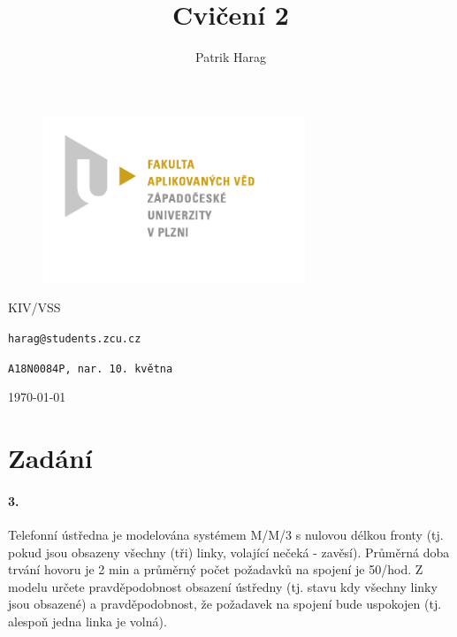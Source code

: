 \documentclass[12pt, a4paper]{article}
\title{Cvičení 2}
\author{Patrik Harag}
\makeatletter
\def \thesubtitle {KIV/VSS}
\def \theauthoremail {harag@students.zcu.cz}
\def \theauthorid {A18N0084P, nar. 10. května}
\makeatother
\begin{document}
\begin{titlepage}
	\begin{figure}
		\includegraphics[height=50mm]{img-fav-logo}
	\end{figure}
	
	\centering
	{\large \hspace{1mm} \par} %
	\vspace{15ex}
	
	{\huge\bfseries \thetitle \par}
	\vspace{2ex}
	{\scshape\Large \thesubtitle \par}
	\vspace{15ex}
	{\Large\itshape \theauthor \par}
	\vspace{2ex}
	{\texttt{\theauthoremail} \par}
	\vspace{1ex}
	{\texttt{\theauthorid} \par}
	
	\vfill

	{\today\par}
\end{titlepage}

\section*{Zadání}

\paragraph{3.}
Telefonní ústředna je modelována systémem M/M/3 s nulovou délkou fronty (tj. pokud jsou obsazeny všechny (tři) linky, volající nečeká - zavěsí). Průměrná doba trvání hovoru je 2 min a průměrný počet požadavků na spojení je 50/hod. Z modelu určete pravděpodobnost obsazení ústředny (tj. stavu kdy všechny linky jsou obsazené) a pravděpodobnost, že požadavek na spojení bude uspokojen (tj. alespoň jedna linka je volná).


\end{document}
